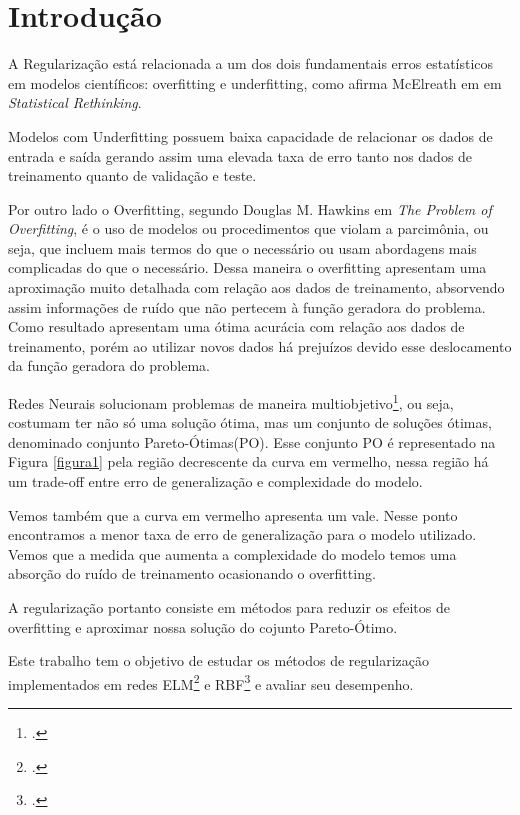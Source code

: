 \section{Introdução}
A Regularização está relacionada a um dos dois fundamentais erros estatísticos em modelos científicos: overfitting e underfitting, como afirma McElreath em em \emph{Statistical Rethinking}\cite{mcelreath2016statistical}.

Modelos com Underfitting possuem baixa capacidade de relacionar os dados de entrada e saída gerando assim uma elevada taxa de erro tanto nos dados de treinamento quanto de validação e teste.

Por outro lado o Overfitting, segundo Douglas M. Hawkins em \emph{The Problem of Overfitting}\cite{OverfittigProblems}, é o uso de modelos ou procedimentos que violam a parcimônia, ou seja, que incluem mais termos do que o necessário ou usam abordagens mais complicadas do que o necessário.\cite*{OverfittigProblems}
Dessa maneira o overfitting apresentam uma aproximação muito detalhada com relação aos dados de treinamento, absorvendo assim informações de ruído que não pertecem à função geradora do problema.
Como resultado apresentam uma ótima acurácia com relação aos dados de treinamento, porém ao utilizar novos dados há prejuízos devido esse deslocamento da função geradora do problema.

Redes Neurais solucionam problemas de maneira multiobjetivo\footcite{Problemas multiobjetivo: Problemas com mais de um objetivo}, ou seja, costumam ter não só uma solução ótima, mas um conjunto de soluções ótimas, denominado conjunto Pareto-Ótimas(PO).
Esse conjunto PO é representado na Figura \ref*{figura1} pela região decrescente da curva em vermelho, nessa região há um trade-off entre erro de generalização e complexidade do modelo.

Vemos também que a curva em vermelho apresenta um vale. Nesse ponto encontramos a menor taxa de erro de generalização para o modelo utilizado.
Vemos que a medida que aumenta a complexidade do modelo temos uma absorção do ruído de treinamento ocasionando o overfitting.

A regularização portanto consiste em métodos para reduzir os efeitos de overfitting e aproximar nossa solução do cojunto Pareto-Ótimo.

Este trabalho tem o objetivo de estudar os métodos de regularização implementados em redes ELM\footcite{ELM: Extreme Learning Machines} e RBF\footcite{RBF: Radial Basis Function} e avaliar seu desempenho.

